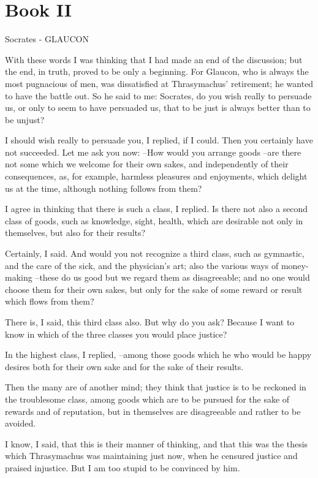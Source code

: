 \chapter{Book II}

Socrates - GLAUCON

With these words I was thinking that I had made an end of the discussion; but the end, in truth, proved to be only a beginning. For Glaucon, who is always the most pugnacious of men, was dissatisfied at Thrasymachus' retirement; he wanted to have the battle out. So he said to me: Socrates, do you wish really to persuade us, or only to seem to have persuaded us, that to be just is always better than to be unjust?

I should wish really to persuade you, I replied, if I could.
Then you certainly have not succeeded. Let me ask you now: --How would you arrange goods --are there not some which we welcome for their own sakes, and independently of their consequences, as, for example, harmless pleasures and enjoyments, which delight us at the time, although nothing follows from them?

I agree in thinking that there is such a class, I replied.
Is there not also a second class of goods, such as knowledge, sight, health, which are desirable not only in themselves, but also for their results?

Certainly, I said.
And would you not recognize a third class, such as gymnastic, and the care of the sick, and the physician's art; also the various ways of money-making --these do us good but we regard them as disagreeable; and no one would choose them for their own sakes, but only for the sake of some reward or result which flows from them?

There is, I said, this third class also. But why do you ask?
Because I want to know in which of the three classes you would place justice?

In the highest class, I replied, --among those goods which he who would be happy desires both for their own sake and for the sake of their results.

Then the many are of another mind; they think that justice is to be reckoned in the troublesome class, among goods which are to be pursued for the sake of rewards and of reputation, but in themselves are disagreeable and rather to be avoided.

I know, I said, that this is their manner of thinking, and that this was the thesis which Thrasymachus was maintaining just now, when he censured justice and praised injustice. But I am too stupid to be convinced by him.

